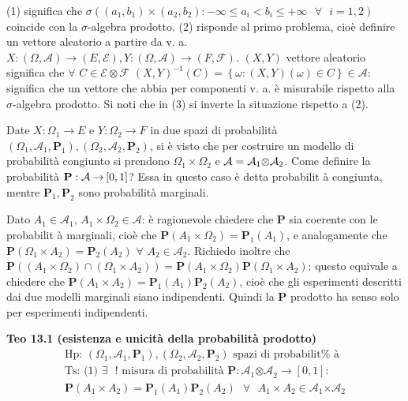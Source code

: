 \documentclass{article}
\begin{document}
(1) significa che $\sigma \left( \left( a_{1},b_{1}\right) \times \left(
a_{2},b_{2}\right) :-\infty \leq a_{i}<b_{i}\leq +\infty \text{ }\forall 
\text{ }i=1,2\right) $ coincide con la $\sigma $-algebra prodotto. (2)
risponde al primo problema, cio\`{e} definire un vettore aleatorio a partire
da v. a. $X:\left( \Omega ,\mathcal{A}\right) \rightarrow \left( E,\mathcal{E%
}\right) ,Y:\left( \Omega ,\mathcal{A}\right) \rightarrow \left( F,\mathcal{F%
}\right) $. $\left( X,Y\right) $ vettore aleatorio significa che $\forall $ $%
C\in \mathcal{E\otimes F}$ $\left( X,Y\right) ^{-1}\left( C\right) =\left\{
\omega :\left( X,Y\right) \left( \omega \right) \in C\right\} \in \mathcal{A}
$: significa che un vettore che abbia per componenti v. a. \`{e} misurabile
rispetto alla $\sigma $-algebra prodotto. Si noti che in (3) si inverte la
situazione rispetto a (2).

Date $X:\Omega _{1}\rightarrow E$ e $Y:\Omega _{2}\rightarrow F$ in due
spazi di probabilit\`{a} $\left( \Omega _{1},\mathcal{A}_{1},\mathbf{P}%
_{1}\right) ,\left( \Omega _{2},\mathcal{A}_{2},\mathbf{P}_{2}\right) $, si 
\`{e} visto che per costruire un modello di probabilit\`{a} congiunto si
prendono $\Omega _{1}\times \Omega _{2}$ e $\mathcal{A=A}_{1}\mathcal{%
\otimes A}_{2}$. Come definire la probabilit\`{a} $\mathbf{P}:\mathcal{%
A\rightarrow }\left[ 0,1\right] $? Essa in questo caso \`{e} detta probabilit%
\`{a} congiunta, mentre $\mathbf{P}_{1}\mathbf{,P}_{2}$ sono probabilit\`{a}
marginali.

Dato $A_{1}\in \mathcal{A}_{1}$, $A_{1}\times \Omega _{2}\in \mathcal{A}$: 
\`{e} ragionevole chiedere che $\mathbf{P}$ sia coerente con le probabilit%
\`{a} marginali, cio\`{e} che $\mathbf{P}\left( A_{1}\times \Omega
_{2}\right) =\mathbf{P}_{1}\left( A_{1}\right) $, e analogamente che $%
\mathbf{P}\left( \Omega _{1}\times A_{2}\right) =\mathbf{P}_{2}\left(
A_{2}\right) $ $\forall $ $A_{2}\in \mathcal{A}_{2}$. Richiedo inoltre che $%
\mathbf{P}\left( \left( A_{1}\times \Omega _{2}\right) \cap \left( \Omega
_{1}\times A_{2}\right) \right) =\mathbf{P}\left( A_{1}\times \Omega
_{2}\right) \mathbf{P}\left( \Omega _{1}\times A_{2}\right) $: questo
equivale a chiedere che $\mathbf{P}\left( A_{1}\times A_{2}\right) =\mathbf{P%
}_{1}\left( A_{1}\right) \mathbf{P}_{2}\left( A_{2}\right) $, cio\`{e} che
gli esperimenti descritti dai due modelli marginali siano indipendenti.
Quindi la $\mathbf{P}$ prodotto ha senso solo per esperimenti indipendenti.

\textbf{Teo 13.1 (esistenza e unicit\`{a} della probabilit\`{a} prodotto)}%
\begin{gather*}
\text{Hp: }\left( \Omega _{1},\mathcal{A}_{1},\mathbf{P}_{1}\right) ,\left(
\Omega _{2},\mathcal{A}_{2},\mathbf{P}_{2}\right) \text{ spazi di probabilit%
\`{a}} \\
\text{Ts: (1) }\exists \text{ }!\text{ misura di probabilit\`{a} }\mathbf{P}:%
\mathcal{A}_{1}\mathcal{\otimes A}_{2}\rightarrow \left[ 0,1\right] : \\
\mathbf{P}\left( A_{1}\times A_{2}\right) =\mathbf{P}_{1}\left( A_{1}\right) 
\mathbf{P}_{2}\left( A_{2}\right) \text{ }\forall \text{ }A_{1}\times
A_{2}\in \mathcal{A}_{1}\mathcal{\times A}_{2}
\end{gather*}
\end{document}
